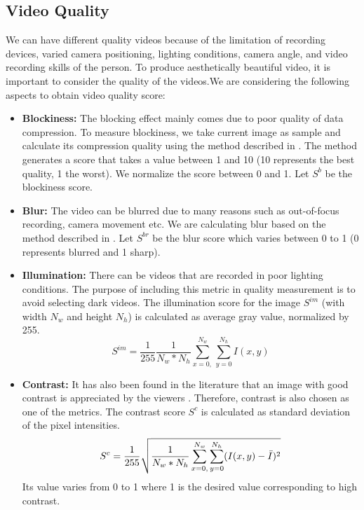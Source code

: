 \documentclass{sig-alternate}
\begin{document}
\subsection{Video Quality}
We can have different quality videos because of the limitation of
recording devices, varied camera positioning, lighting conditions,
camera angle, and video recording skills of the person. To produce
aesthetically beautiful video, it is important to consider the quality of the videos.We are considering the following aspects to obtain video quality score:
\begin{itemize}
    \item \textbf{Blockiness:} The blocking effect mainly comes due to poor quality of data compression. To measure blockiness, we take current image as sample and calculate its compression quality using the method described in \cite{18}. The method generates a score that takes a value between 1 and 10 (10 represents the best quality, 1 the worst). We normalize the score between 0 and 1. Let $S^b$ be the blockiness score.
    \item \textbf{Blur:} The video can be blurred due to many reasons such as out-of-focus recording, camera movement etc. We are calculating blur based on the method described in \cite{5}. Let $S^{br}$ be the blur score which varies between 0 to 1 (0 represents blurred and 1 sharp).
    \item \textbf{Illumination:} There can be videos that are recorded in poor lighting conditions. The purpose of including this metric in quality measurement is to avoid selecting dark videos. The illumination score for the image $S^{im}$ (with width $N_w$ and height $N_h$) is calculated as average gray value, normalized by 255.
    \begin{equation}
        S^{im}=\frac{1}{255}\frac{1}{N_w * N_h}\sum_{x=0,}^{N_w}\sum_{y=0}^{N_h} I(x,y)
    \end{equation}
    \item \textbf{Contrast:} It has also been found in the literature that an image with good contrast is appreciated by the viewers \cite{10}. Therefore, contrast is also chosen as one of the metrics. The contrast score $S^c$ is calculated as standard deviation of the pixel intensities.
    \begin{equation}
        S^c=\frac{1}{255}\sqrt{\frac{1}{N_w * N_h}\sum_{x=0,}^{N_w}\sum_{y=0}^{N_h}(I(x,y)-\Bar{I})^2}
    \end{equation}
    Its value varies from 0 to 1 where 1 is the desired value corresponding to high contrast.

\end{itemize}
\end{document}
